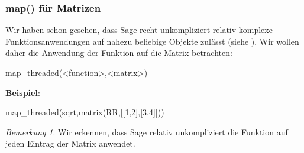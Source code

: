 \documentclass[fontsize=12pt,paper=a4,twoside,bibtotoc,idxtotoc,
liststotoc,pagesize,BCOR1.2cm,DIV15,chapterprefix,pagesize=pdftex]{scrbook}
\theoremstyle{plain}
\theoremstyle{definition}
\theoremstyle{remark}
\newtheorem{bem}[equation]{Bemerkung}
\begin{document}
\subsubsection{map() für Matrizen}
Wir haben schon gesehen, dass Sage recht unkompliziert relativ komplexe Funktionsanwendungen auf nahezu beliebige Objekte 
zulässt (siehe ). Wir wollen daher die Anwendung der Funktion  auf die Matrix  betrachten:
\begin{sagein}
map_threaded(<function>,<matrix>)
\end{sagein}
\textbf{Beispiel}:
\begin{sagein}
map_threaded(sqrt,matrix(RR,[[1,2],[3,4]]))
\end{sagein}
\begin{sageout}
[1.00000000000000 1.41421356237310]
[1.73205080756888 2.00000000000000] 
\end{sageout}
\begin{bem}
 Wir erkennen, dass Sage relativ unkompliziert die Funktion auf jeden Eintrag der Matrix anwendet.
\end{bem}
\end{document}

